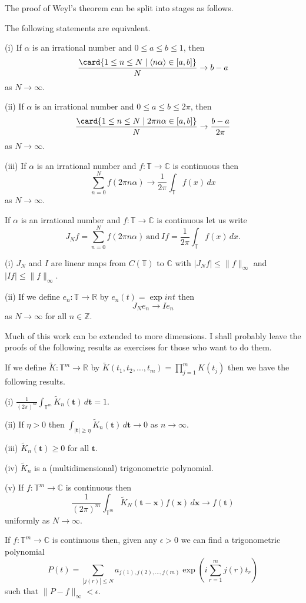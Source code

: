 The proof of Weyl's theorem can be split into stages as follows.
\begin{lemma} The following statements are equivalent.

(i) If $\alpha$ is an irrational
number and $0\leq a\leq b\leq 1$, then
\[\frac{\card\{1\leq n\leq N \mid \langle n\alpha\rangle
\in [a,b]\}}{N}
\rightarrow b-a\]
as $N\rightarrow\infty$.

(ii) If $\alpha$ is an irrational
number and $0\leq a\leq b\leq 2\pi$, then
\[\frac{\card\{1\leq n\leq N \mid  2\pi n\alpha
\in [a,b]\}}{N}
\rightarrow \frac{b-a}{2\pi}\]
as $N\rightarrow\infty$.

(iii) If $\alpha$ is an irrational
number and $f:{\mathbb T}\rightarrow{\mathbb C}$
is continuous then
\[\sum_{n=0}^{N}f(2\pi n\alpha)\rightarrow
\frac{1}{2\pi}\int_{\mathbb T}f(x)\,dx\]
as $N\rightarrow\infty$.
\end{lemma}
\begin{lemma} If $\alpha$ is an irrational
number and $f:{\mathbb T}\rightarrow{\mathbb C}$
is continuous let us write
\[J_{N}f=\sum_{n=0}^{N}f(2\pi n\alpha)
\ \text{and}
\ If=\frac{1}{2\pi}\int_{\mathbb T}f(x)\,dx.\]

(i) $J_{N}$ and $I$ are linear maps from $C({\mathbb T})$
to ${\mathbb C}$ with $|J_{N}f|\leq\|f\|_{\infty}$
and $|If|\leq\|f\|_{\infty}$.

(ii) If we define $e_{n}:{\mathbb T}\rightarrow{\mathbb R}$
by $e_{n}(t)=\exp int$ then
\[J_{N}e_{n}\rightarrow Ie_{n}\]
as $N\rightarrow\infty$ for all $n\in{\mathbb Z}$.
\end{lemma}

Much of this work can be extended to more dimensions. I shall probably
leave the proofs of the following results as exercises for those
who want to do them.
\begin{lemma}\label{ L, many start}
If we define $\tilde{K}:{\mathbb T}^{m}\rightarrow{\mathbb R}$
by $\tilde{K}(t_{1},t_{2},\dots,t_{m})=\prod_{j=1}^{m}K(t_{j})$
then we have the following results.

(i) $\frac{1}{(2\pi)^{m}}\int_{{\mathbb T}^{m}}
\tilde{K}_{n}({\mathbf t})\, d{\mathbf t}=1$.

(ii) If $\eta>0$ then
$\int_{|{\mathbf t}|\geq\eta}\tilde{K}_{n}({\mathbf t})
\,d{\mathbf t}\rightarrow 0$
as $n\rightarrow\infty$.

(iii) $\tilde{K}_{n}({\mathbf t})\geq 0$ for all ${\mathbf t}$.

(iv) $\tilde{K}_{n}$ is a (multidimensional) trigonometric
polynomial.

(v) If $f:{\mathbb T}^{m}\rightarrow{\mathbb C}$ is continuous then
\[\frac{1}{(2\pi)^{m}}\int_{{\mathbb T}^{m}}
\tilde{K}_{N}({\mathbf t}-{\mathbf x})f({\mathbf x})\,d{\mathbf x}
\rightarrow f({\mathbf t})\]
uniformly as $N\rightarrow\infty$.
\end{lemma}
\begin{lemma}
If $f:{\mathbb T}^{m}\rightarrow{\mathbb C}$
is continuous then, given any $\epsilon>0$ we can find a
trigonometric polynomial
\[P(t)=\sum_{|j(r)|\leq N}a_{j(1),j(2),\dots,j(m)}
\exp \left(i\sum_{r=1}^{m}j(r)t_{r}\right)\]
such that $\|P-f\|_{\infty}<\epsilon$.
\end{lemma}

